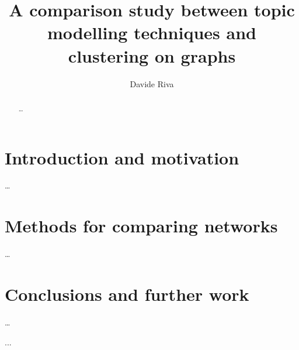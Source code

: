 \documentclass{masterthesis}
\begin{document}
\title{A comparison study between topic modelling techniques and clustering on graphs}

\author{Davide Riva}



\maketitle

\begin{abstract}
    \dots
\end{abstract}

\dedication{To my beloved cat}

\setcounter{tocdepth}{1}
\tableofcontents

\chapter{Introduction and motivation}
\dots




\chapter{Methods for comparing networks}
\dots



\chapter{Conclusions and further work}
\dots

\nocite{*}



\appendix




...


\end{document}
